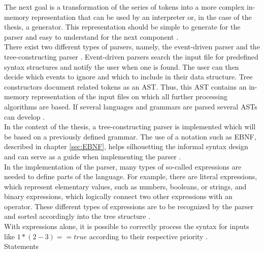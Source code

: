 The next goal is a transformation of the series of tokens into a more complex in-memory representation that can be used by an interpreter or, in the case of the thesis, a generator. This representation should be simple to generate for the parser and easy to understand for the next component \parencite[cf.][p. 59]{nystrom_crafting_2021}.\\
There exist two different types of parsers, namely, the event-driven parser and the tree-constructing parser \parencite[cf.][p. 5]{sarkar_code_2001}. Event-driven parsers search the input file for predefined syntax structures and notify the user when one is found. The user can then decide which events to ignore and which to include in their data structure. Tree constructors document related tokens as an \ac{AST}. Thus, this \ac{AST} contains an in-memory representation of the input files on which all further processing algorithms are based. If several languages and grammars are parsed several \ac{AST}s can develop \parencite[cf.][pp. 5-6]{sarkar_code_2001}.\\
In the context of the thesis, a tree-constructing parser is implemented which will be based on a previously defined grammar. The use of a notation such as \ac{EBNF}, described in chapter \ref{sec:EBNF}, helps silhouetting the informal syntax design and can serve as a guide when implementing the parser \parencite[cf.][p. 64]{nystrom_crafting_2021}.\\
In the implementation of the parser, many types of so-called expressions are needed to define parts of the language. For example, there are literal expressions, which represent elementary values, such as numbers, booleans, or strings, and binary expressions, which logically connect two other expressions with an operator. These different types of expressions are to be recognized by the parser and sorted accordingly into the tree structure \parencite[see][pp. 64-68]{nystrom_crafting_2021}.\\
With expressions alone, it is possible to correctly process the syntax for inputs like $1 * (2 - 3) == true$ according to their respective priority \parencite[cf.][p. 64]{nystrom_crafting_2021}.\\
Statements \parencite[see][pp. 111-116]{nystrom_crafting_2021}